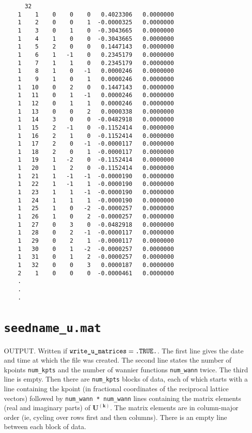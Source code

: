 \begin{verbatim}
      32
    1    1    0    0    0   0.4023306   0.0000000
    1    2    0    0    1  -0.0000325   0.0000000
    1    3    0    1    0  -0.3043665   0.0000000
    1    4    1    0    0  -0.3043665   0.0000000
    1    5    2    0    0   0.1447143   0.0000000
    1    6    1   -1    0   0.2345179   0.0000000
    1    7    1    1    0   0.2345179   0.0000000
    1    8    1    0   -1   0.0000246   0.0000000
    1    9    1    0    1   0.0000246   0.0000000
    1   10    0    2    0   0.1447143   0.0000000
    1   11    0    1   -1   0.0000246   0.0000000
    1   12    0    1    1   0.0000246   0.0000000
    1   13    0    0    2   0.0000338   0.0000000
    1   14    3    0    0  -0.0482918   0.0000000
    1   15    2   -1    0  -0.1152414   0.0000000
    1   16    2    1    0  -0.1152414   0.0000000
    1   17    2    0   -1  -0.0000117   0.0000000
    1   18    2    0    1  -0.0000117   0.0000000
    1   19    1   -2    0  -0.1152414   0.0000000
    1   20    1    2    0  -0.1152414   0.0000000
    1   21    1   -1   -1  -0.0000190   0.0000000
    1   22    1   -1    1  -0.0000190   0.0000000
    1   23    1    1   -1  -0.0000190   0.0000000
    1   24    1    1    1  -0.0000190   0.0000000
    1   25    1    0   -2  -0.0000257   0.0000000
    1   26    1    0    2  -0.0000257   0.0000000
    1   27    0    3    0  -0.0482918   0.0000000
    1   28    0    2   -1  -0.0000117   0.0000000
    1   29    0    2    1  -0.0000117   0.0000000
    1   30    0    1   -2  -0.0000257   0.0000000
    1   31    0    1    2  -0.0000257   0.0000000
    1   32    0    0    3   0.0000187   0.0000000
    2    1    0    0    0  -0.0000461   0.0000000
    .
    .
    .
\end{verbatim}


\section{{\tt seedname\_u.mat}}
OUTPUT. Written if $\verb#write_u_matrices#=\verb#.TRUE.#$. The first line gives the date and
time at which the file was created.
The second line states the number of kpoints {\tt num\_kpts} and the number of wannier
functions {\tt num\_wann} twice. The third line is empty.
Then there are {\tt num\_kpts} blocks of data, each of which starts with a line containing the kpoint 
(in fractional coordinates of the reciprocal lattice vectors) 
followed by {\tt num\_wann * num\_wann} lines containing the matrix elements (real and imaginary parts) of
$\mathbf{U}^{(\mathbf{k})}$.
The matrix elements are in column-major order (ie, cycling over rows first and then columns).
There is an empty line between each block of data.

